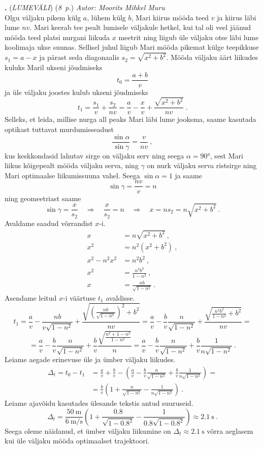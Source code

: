 \documentclass[11pt,a5paper]{article}
\newcommand{\numb}[1]{\vspace{5pt}\textbf{\large #1}}
\newcommand{\nimi}[1]{(\textsl{\small #1})}
\newcommand{\punktid}[1]{(\emph{#1~p.})}
\newcounter{ylesanne}
\newcommand{\yl}[1]{\addtocounter{ylesanne}{1}\numb{\theylesanne.} \nimi{#1} \newblock{}}
\newcommand{\autor}[1]{\emph{Autor: #1}}%
\begin{document}
\yl{LUMEVÄLI}
\punktid{8} \autor{Moorits Mihkel Muru}\\
Olgu väljaku pikem külg \(a\), lühem külg \(b\), Mari kiirus mööda teed \(v\) ja kiirus läbi lume \(nv\). Mari keerab tee pealt lumisele väljakule hetkel, kui tal oli veel jäänud mööda teed platsi nurgani liikuda \(x\) meetrit ning liigub üle väljaku otse läbi lume koolimaja ukse suunas. Sellisel juhul liigub Mari mööda pikemat külge teepikkuse \(s_1 = a - x\) ja pärast seda diagonaalis \(s_2 = \sqrt{x^2 + b^2}\). Mööda väljaku äärt liikudes kuluks Maril ukseni jõudmiseks
\[
    t_0 = \frac{a + b}{v}
\]
ja üle väljaku joostes kulub ukseni jõudmiseks
\[
    t_1 = \frac{s_1}{v} + \frac{s_2}{nv} = \frac{a}{v} - \frac{x}{v} + \frac{\sqrt{x^2 + b^2}}{nv} \ .
\]
Selleks, et leida, millise nurga all peaks Mari läbi lume jooksma, saame kasutada optikast tuttavat murdumisseadust
\[
    \frac{\sin \alpha}{\sin \gamma} = \frac{v}{nv} \ ,
\]
kus keskkondasid lahutav sirge on väljaku serv ning seega \(\alpha = \ang{90}\), sest Mari liikus kõigepealt mööda väljaku serva, ning \(\gamma\) on nurk väljaku serva ristsirge ning Mari optimaalse liikumissuuna vahel. Seega \(\sin \alpha = 1\) ja saame
\[
    \sin \gamma = \frac{nv}{v} = n
\]
ning geomeetriast saame
\[
    \sin \gamma = \frac{x}{s_2} \quad \Rightarrow \quad \frac{x}{s_2} = n \quad \Rightarrow \quad x = n s_2 = n \sqrt{x^2 + b^2} \ .
\]
Avaldame saadud võrrandist \(x\)-i.
\begin{align*}
    x &= n \sqrt{x^2 + b^2} \ , \\
    x^2 &= n^2 (x^2 + b^2) \ , \\
    x^2 - n^2 x^2 &= n^2 b^2 \ , \\
    x^2 &= \frac{n^2 b^2}{1 - n^2} \ , \\
    x &= \frac{n b}{\sqrt{1 - n^2}} \ .
\end{align*}
Asendame leitud \(x\)-i väärtuse \(t_1\) avaldisse.
\[
    t_1 = \frac{a}{v} - \frac{n b}{v\sqrt{1 - n^2}} + \frac{\sqrt{\left(\frac{n b}{\sqrt{1 - n^2}}\right)^2 + b^2}}{n v} = \frac{a}{v} - \frac{b}{v} \frac{n}{\sqrt{1-n^2}} + \frac{\sqrt{\frac{n^2 b^2}{1 - n^2} + b^2}}{n v} = 
\]
\[
    = \frac{a}{v} - \frac{b}{v} \frac{n}{\sqrt{1-n^2}} + \frac{b}{v} \frac{\sqrt{\frac{n^2 + 1 - n^2}{1-n^2}}}{n} = \frac{a}{v} - \frac{b}{v} \frac{n}{\sqrt{1-n^2}} + \frac{b}{v} \frac{1}{n\sqrt{1-n^2}} \ .
\]
Leiame aegade erinevuse üle ja ümber väljaku liikudes.
\begin{align*}
    \Delta_t = t_0 - t_1 &= \frac{a}{v} + \frac{b}{v} - \left( \frac{a}{v} - \frac{b}{v} \frac{n}{\sqrt{1-n^2}} + \frac{b}{v} \frac{1}{n\sqrt{1-n^2}} \right) = \\
    &= \frac{b}{v} \left( 1 + \frac{n}{\sqrt{1-n^2}} - \frac{1}{n\sqrt{1-n^2}} \right) \ .
\end{align*}
Leiame ajavõidu kasutades ülesande tekstis antud suuruseid.
\[
    \Delta_t = \frac{\SI{50}{\metre}}{\SI{6}{\metre\per\second}} \left( 1 + \frac{\num{0.8}}{\sqrt{1-\num{0.8}^2}} - \frac{1}{\num{0.8}\sqrt{1-\num{0.8}^2}} \right) \approx \SI{2.1}{\second} \ .
\]
Seega oleme näidanud, et ümber väljaku liikumine on \(\Delta_t \approx \SI{2.1}{\second}\) võrra aeglasem kui üle väljaku mööda optimaalset trajektoori. \\
\end{document}
